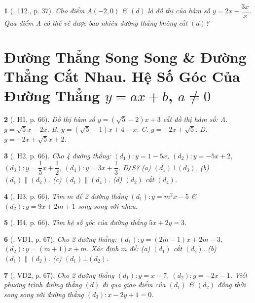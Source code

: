 \documentclass{article}
\newtheorem{baitoan}{}
\begin{document}
\begin{baitoan}[\cite{Tuyen_Toan_9_old}, 112., p. 37]
	Cho điểm $A(-2,0)$ \& $(d)$ là đồ thị của hàm số $y = 2x - \dfrac{3x}{x}$. Qua điểm A có thể vẽ được bao nhiêu đường thẳng không cắt $(d)$?
\end{baitoan}


\section{Đường Thẳng Song Song \& Đường Thẳng Cắt Nhau. Hệ Số Góc Của Đường Thẳng $y = ax + b$, $a\ne0$}

\begin{baitoan}[\cite{Binh_boi_duong_Toan_9_tap_1}, H1, p. 66]
	Đồ thị hàm số $y = (\sqrt{5} - 2)x + 3$ cắt đồ thị hàm số: {\sf A.} $y =  \sqrt{5}x - 2x$. {\sf B.} $y = (\sqrt{5} - 1)x + 4 - x$. {\sf C.} $y = -2x + \sqrt{5}$. {\sf D.} $y = -2x + \sqrt{5}x + 2$.
\end{baitoan}

\begin{baitoan}[\cite{Binh_boi_duong_Toan_9_tap_1}, H2, p. 66]
	Cho 4 đường thẳng: $ (d_1):y = 1 - 5x$, $ (d_2):y = -5x + 2$, $(d_3): y = \dfrac{1}{5}x + \dfrac{1}{2}$, $(d_4):y = 3x + \dfrac{1}{3}$. {\rm Đ{\tt/}S?} (a) $(d_1)\bot(d_3)$. (b) $(d_1)\parallel(d_2)$. (c) $(d_1)\parallel(d_4)$. (d) $(d_2)$ cắt $(d_4)$.
\end{baitoan}

\begin{baitoan}[\cite{Binh_boi_duong_Toan_9_tap_1}, H3, p. 66]
	Tìm $m$ để 2 đường thẳng $(d_1):y = m^2x - 5$ \& $(d_2):y = 9x + 2m + 1$ song song với nhau.
\end{baitoan}

\begin{baitoan}[\cite{Binh_boi_duong_Toan_9_tap_1}, H4, p. 66]
	Tìm hệ số góc của đường thẳng $5x + 2y = 3$.
\end{baitoan}

\begin{baitoan}[\cite{Binh_boi_duong_Toan_9_tap_1}, VD1, p. 67]
	Cho 2 đường thẳng: $(d_1):y = (2m - 1)x + 2m - 3$, $(d_2):y = (m + 1)x + m$. Xác định $m$ để: (a) $(d_1)$ cắt $(d_2)$. (b) $(d_1)\parallel(d_2)$. (c) $(d_1)\bot(d_2)$.
\end{baitoan}

\begin{baitoan}[\cite{Binh_boi_duong_Toan_9_tap_1}, VD2, p. 67]
	Cho 2 đường thẳng $(d_1):y = x - 7$, $(d_2):y = -2x - 1$. Viết phương trình đường thẳng $(d)$ đi qua giao điểm của $(d_1)$ \& $(d_2)$ đồng thời song song với đường thẳng $(d_3):x - 2y + 1 = 0$.
\end{baitoan}
\end{document}
